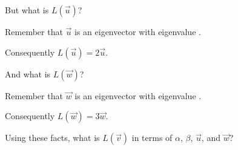 \documentclass{ximera}
\begin{document}
\begin{question}
  But what is $L(\vec{u})$?
  \begin{solution}
    \begin{hint}
      \begin{question}
        \begin{solution}
          Remember that $\vec{u}$ is an eigenvector with eigenvalue .
        \end{solution}

        Consequently $L(\vec{u}) = 2 \vec{u}$.
      \end{question}
    \end{hint}
    
    \begin{multiple-choice}
    \end{multiple-choice}   
  \end{solution}
  
  And what is $L(\vec{w})$?
  \begin{solution}
    \begin{hint}
      \begin{question}
        \begin{solution}
          Remember that $\vec{w}$ is an eigenvector with eigenvalue .
        \end{solution}

        Consequently $L(\vec{w}) = 3 \vec{w}$.
      \end{question}
    \end{hint}
    
    \begin{multiple-choice}
    \end{multiple-choice}   
  \end{solution}
  
  Using these facts, what is $L(\vec{v})$ in terms of $\alpha$, $\beta$, $\vec{u}$, and $\vec{w}$?
  \begin{solution}
    \begin{multiple-choice}
    \end{multiple-choice} 
  \end{solution}
  

\end{question}
\end{document}
